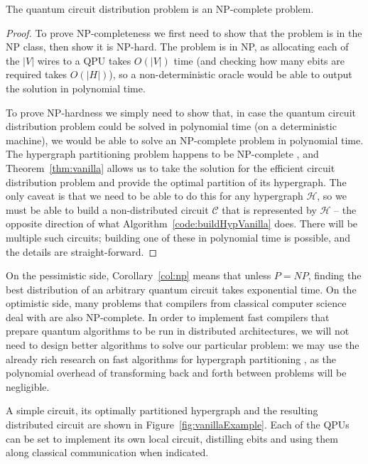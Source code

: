 \begin{corollary} The quantum circuit distribution problem is an NP-complete problem.
\label{col:np}
\end{corollary} \begin{proof}
To prove NP-completeness we first need to show that the problem is in the NP class, then show it is NP-hard. The problem is in NP, as allocating each of the \(|V|\) wires to a QPU takes \(O(|V|)\) time (and checking how many ebits are required takes \(O(|H|)\)), so a non-deterministic oracle would be able to output the solution in polynomial time. 

To prove NP-hardness we simply need to show that, in case the quantum circuit distribution problem could be solved in polynomial time (on a deterministic machine), we would be able to solve an NP-complete problem in polynomial time. The hypergraph partitioning problem happens to be NP-complete \citep{NP-complete}, and Theorem~\ref{thm:vanilla} allows us to take the solution for the efficient circuit distribution problem and provide the optimal partition of its hypergraph. The only caveat is that we need to be able to do this for any hypergraph \(\mathcal{H}\), so we must be able to build a non-distributed circuit \(\mathcal{C}\) that is represented by \(\mathcal{H}\) -- the opposite direction of what Algorithm~\ref{code:buildHypVanilla} does. There will be multiple such circuits; building one of these in polynomial time is possible, and the details are straight-forward.

\end{proof}

On the pessimistic side, Corollary~\ref{col:np} means that unless \(P=NP\), finding the best distribution of an arbitrary quantum circuit takes exponential time. On the optimistic side, many problems that compilers from classical computer science deal with are also NP-complete. In order to implement fast compilers that prepare quantum algorithms to be run in distributed architectures, we will not need to design better algorithms to solve our particular problem: we may use the already rich research on fast algorithms for hypergraph partitioning \citep{KaHyPart}, as the polynomial overhead of transforming back and forth between problems will be negligible.



A simple circuit, its optimally partitioned hypergraph and the resulting distributed circuit are shown in Figure~\ref{fig:vanillaExample}. Each of the QPUs can be set to implement its own local circuit, distilling ebits and using them along classical communication when indicated.


